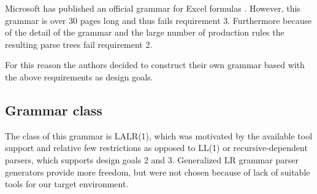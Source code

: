 \documentclass[conference]{IEEEtran}
\begin{document}
Microsoft has published an official grammar for Excel formulas \cite{ExcelOfficialGrammar}.
However, this grammar is over 30 pages long and thus fails requirement 3.
Furthermore because of the detail of the grammar and the large number of production rules the resulting parse trees fail requirement 2.

For this reason the authors decided to construct their own grammar based with the above requirements as design goals.

\subsection{Grammar class}

The class of this grammar is LALR(1), which was motivated by the available tool support and relative few restrictions as opposed to LL(1) or recursive-dependent parsers, which supports design goals 2 and 3.
Generalized LR grammar parser generators provide more freedom, but were not chosen because of lack of suitable tools for our target environment.
\end{document}
